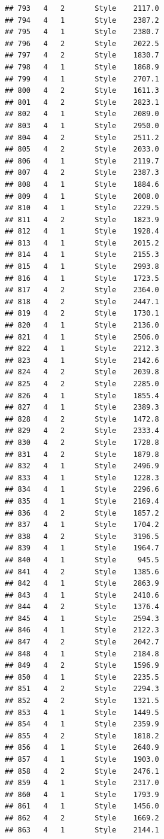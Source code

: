 \documentclass[12pt,]{krantz}
\theoremstyle{definition}
\theoremstyle{definition}
\theoremstyle{remark}
\begin{document}
\begin{verbatim}
## 793   4   2       Style    2117.0
## 794   4   1       Style    2387.2
## 795   4   1       Style    2380.7
## 796   4   2       Style    2022.5
## 797   4   2       Style    1830.7
## 798   4   1       Style    1868.9
## 799   4   1       Style    2707.1
## 800   4   2       Style    1611.3
## 801   4   2       Style    2823.1
## 802   4   1       Style    2089.0
## 803   4   1       Style    2950.0
## 804   4   2       Style    2511.2
## 805   4   2       Style    2033.0
## 806   4   1       Style    2119.7
## 807   4   2       Style    2387.3
## 808   4   1       Style    1884.6
## 809   4   1       Style    2008.0
## 810   4   1       Style    2229.5
## 811   4   2       Style    1823.9
## 812   4   1       Style    1928.4
## 813   4   1       Style    2015.2
## 814   4   1       Style    2155.3
## 815   4   1       Style    2993.8
## 816   4   1       Style    1723.5
## 817   4   2       Style    2364.0
## 818   4   2       Style    2447.1
## 819   4   2       Style    1730.1
## 820   4   1       Style    2136.0
## 821   4   1       Style    2506.0
## 822   4   1       Style    2212.3
## 823   4   1       Style    2142.6
## 824   4   2       Style    2039.8
## 825   4   2       Style    2285.0
## 826   4   1       Style    1855.4
## 827   4   1       Style    2389.3
## 828   4   2       Style    1472.8
## 829   4   2       Style    2333.4
## 830   4   2       Style    1728.8
## 831   4   2       Style    1879.8
## 832   4   1       Style    2496.9
## 833   4   1       Style    1228.3
## 834   4   1       Style    2296.6
## 835   4   1       Style    2169.4
## 836   4   2       Style    1857.2
## 837   4   1       Style    1704.2
## 838   4   2       Style    3196.5
## 839   4   1       Style    1964.7
## 840   4   1       Style     945.5
## 841   4   2       Style    1385.6
## 842   4   1       Style    2863.9
## 843   4   1       Style    2410.6
## 844   4   2       Style    1376.4
## 845   4   1       Style    2594.3
## 846   4   1       Style    2122.3
## 847   4   2       Style    2042.7
## 848   4   1       Style    2184.8
## 849   4   2       Style    1596.9
## 850   4   1       Style    2235.5
## 851   4   2       Style    2294.3
## 852   4   2       Style    1321.5
## 853   4   1       Style    1449.5
## 854   4   1       Style    2359.9
## 855   4   2       Style    1818.2
## 856   4   1       Style    2640.9
## 857   4   1       Style    1903.0
## 858   4   2       Style    2476.1
## 859   4   1       Style    2317.0
## 860   4   1       Style    1793.9
## 861   4   1       Style    1456.0
## 862   4   2       Style    1669.2
## 863   4   1       Style    2144.1

\end{verbatim}
\end{document}
